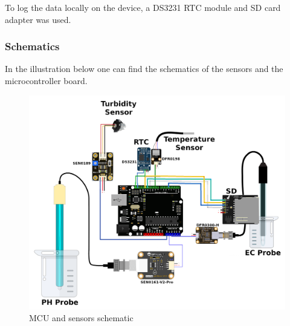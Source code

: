 To log the data locally on the device, a DS3231 RTC module and SD card adapter was used.

\newpage
\subsubsection{Schematics}
In the illustration below one can find the schematics of the sensors and the microcontroller board.
\begin{figure}[h]
\centering
\includegraphics[scale=0.8]{070_design/sensors/47_schematic.png}
\caption{MCU and sensors schematic}
\end{figure}

